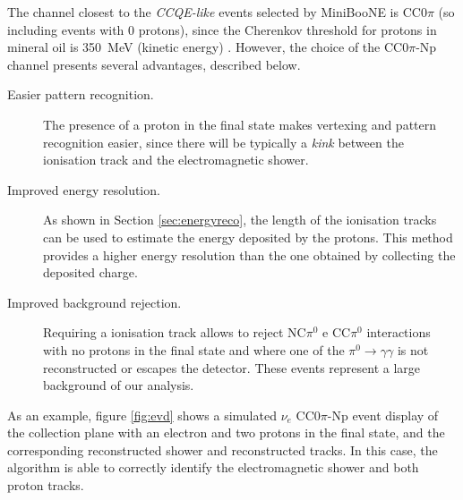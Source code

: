 The channel closest to the \emph{CCQE-like} events selected by MiniBooNE is CC0$\pi$ (so including events with 0 protons), since the Cherenkov threshold for protons in mineral oil is 350~MeV (kinetic energy) \cite{Perevalov:2009mn}.
However, the choice of the CC0$\pi$-Np channel presents several advantages, described below.
\begin{description}
    \item[Easier pattern recognition.] The presence of a proton in the final state makes vertexing and pattern recognition easier, since there will be typically a \emph{kink} between the ionisation track and the electromagnetic shower.
    \item[Improved energy resolution.] As shown in Section \ref{sec:energyreco}, the length of the ionisation tracks can be used to estimate the energy deposited by the protons. This method provides a higher energy resolution than the one obtained by collecting the deposited charge.
    \item[Improved background rejection.] Requiring a ionisation track allows to reject NC$\pi^0$ e CC$\pi^0$ interactions with no protons in the final state and where one of the $\pi^0\rightarrow\gamma\gamma$ is not reconstructed or escapes the detector. These events represent a large background of our analysis. 
\end{description}


As an example, figure \ref{fig:evd} shows a simulated $\nu_{e}$ CC0$\pi$-Np event display of the collection plane with an electron and two protons in the final state, and the corresponding reconstructed shower and reconstructed tracks. In this case, the algorithm is able to correctly identify the electromagnetic shower and both proton tracks.

